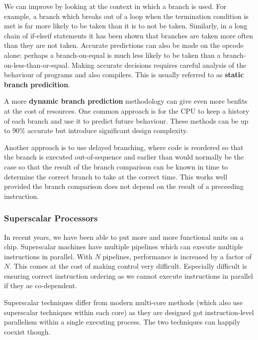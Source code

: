 \documentclass{article}
\begin{document}
	\par 
	We can improve by looking at the context in which a branch is used. For example, a branch which breaks out of a loop when the termination condition is met is far more likely to be taken than it is to not be taken. Similarly, in a long chain of if-elseif statements it has been shown that branches are taken more often than they are not taken. Accurate predictions can also be made on the opcode alone: perhaps a branch-on-equal is much less likely to be taken than a branch-on-less-than-or-equal. Making accurate decisions requires careful analysis of the behaviour of programs and also compilers. This is usually referred to as \textbf{static branch predicition}.
	
	\par A more \textbf{dynamic branch prediction} methodology can give even more benfits at the cost of resources. One common approach is for the CPU to keep a history of each branch and use it to predict future behaviour. These methods can be up to 90\% accurate but introduce significant design complexity.
	
	\par Another approach is to use delayed branching, where code is reordered so that the branch is executed out-of-sequence and earlier than would normally be the case so that the result of the branch comparison can be known in time to determine the correct branch to take at the correct time. This works well provided the branch comparison does not depend on the result of a preceeding instruction.	
	
	\subsubsection{Superscalar Processors}
	In recent years, we have been able to put more and more functional units on a chip. Superscalar machines have multiple pipelines which can execute multiple instructions in parallel. With $N$ pipelines,	performance is increased by a factor of $N$. This comes at the cost of making control very difficult. Especially difficult is ensuring correct instruction ordering as we cannot execute instructions in parallel if they ae co-dependent.
	
	\par Superscalar techniques differ from modern multi-core methods (which also use superscalar techniques within each core) as they are designed got instruction-level parallelism within a single executing process. The two techniques can happily coexist though.
	
	\newpage
	\listoffigures
	\printindex	
\end{document}
